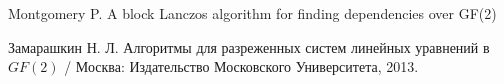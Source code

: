 \begin{thebibliography}{4}
	 Montgomery P. A block Lanczos algorithm for finding dependencies over GF(2)

	 Замарашкин Н. Л. Алгоритмы для разреженных систем линейных уравнений в $GF(2)$ / Москва: Издательство Московского
		Университета, 2013.
\end{thebibliography}

